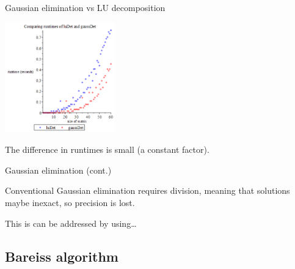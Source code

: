 \documentclass{beamer}
\begin{document}
\begin{frame}{Gaussian elimination vs LU decomposition}

    \begin{center}{}
        \includegraphics[height=180]{lu-gauss}
    \end{center}

    The difference in runtimes is small (a constant factor).
\end{frame}

\begin{frame}{Gaussian elimination (cont.)}

    Conventional Gaussian elimination requires division, meaning that solutions maybe inexact,
    so precision is lost.

    This is can be addressed by using\dots

\end{frame}

\subsection{Bareiss algorithm}
\end{document}
